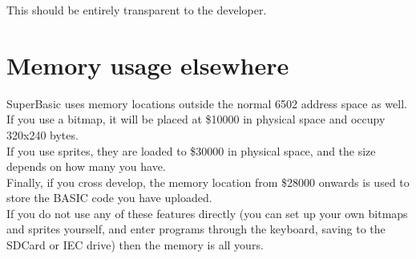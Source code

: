This should be entirely transparent to the developer.

\section{Memory usage elsewhere}

SuperBasic uses memory locations outside the normal 6502 address space as well. \\

If you use a bitmap, it will be placed at \$10000 in physical space and occupy 320x240 bytes.\\

If you use sprites, they are loaded to \$30000 in physical space, and the size depends on how many you have.\\

Finally, if you cross develop, the memory location from \$28000 onwards is used to store the BASIC code you have uploaded.\\

If you do not use any of these features directly (you can set up your own bitmaps and sprites yourself, and enter programs through the keyboard, saving to the SDCard or IEC drive) then the memory is all yours.